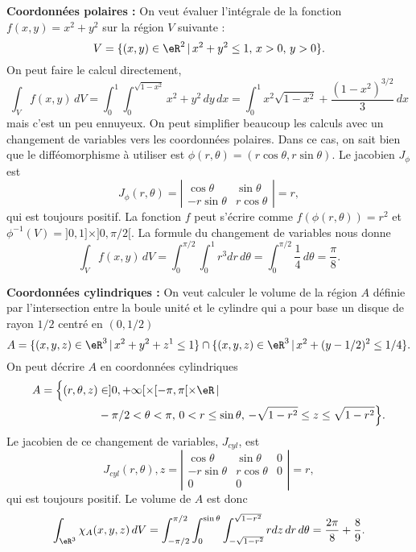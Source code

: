 \begin{example} 
\textbf{Coordonnées polaires : }On veut évaluer l'intégrale de la fonction $f(x,y)= x^2+y^2$ sur la région $V$ suivante :
\[
V=\{(x,y) \in \eR^2\,\vert\, x^2+y^2\leq 1,\, x>0,\, y>0\}.
\]
On peut faire le calcul directement,
\[
\int_{V}f(x,y)\, dV=\int_0^1\int_0^{\sqrt{1-x^2}}x^2+y^2\, dy\,dx=\int_0^1x^2\sqrt{1-x^2} + \frac{(1-x^2)^{3/2}}{3}\, dx  
\] 
mais c'est un peu ennuyeux. On peut simplifier beaucoup les calculs avec un changement de variables vers les coordonnées polaires. Dans ce cas, on sait bien que le difféomorphisme à utiliser est $\phi(r,\theta)=(r\cos \theta, r\sin\theta)$. Le jacobien  $J_{\phi}$ est
\begin{equation}
 J_{\phi}(r, \theta)= \left\vert\begin{array}{cc}
\cos \theta & \sin \theta \\
-r\sin \theta  & r\cos \theta
\end{array}\right\vert= r,
\end{equation}
qui est toujours positif. La fonction $f$ peut s'écrire comme $f(\phi(r,\theta))=r^2$ et $\phi^{-1}(V)=]0,1]\times]0, \pi/2[$.  
La formule du changement de variables nous donne
\[
\int_{V}f(x,y)\, dV=\int_0^{\pi/2}\int_0^{1}r^3 dr\,d\theta=\int_0^{\pi/2}\frac{1}{4}\,d\theta=\frac{\pi}{8}.  
\] 
\end{example}

\begin{example}
\textbf{Coordonnées cylindriques : }On veut calculer le volume de la région $A$ définie par  l'intersection entre la boule unité et le cylindre qui a pour base un disque de rayon $1/2$ centré en $(0, 1/2)$
\[
A=\{(x,y,z) \in\eR^3 \,\vert\, x^2+y^2+z^1\leq 1\}\cap\{(x,y,z) \in \eR^3\,\vert\, x^2+(y-1/2)^2\leq 1/4\}.
\]
On peut décrire $A$ en coordonnées cylindriques
\begin{equation}
  \begin{aligned}
    A=\Big\{(r,\theta,z) &\in ]0, +\infty[\times [-\pi,\pi[\times \eR\,\vert\,\\
& -\pi/2<\theta<\pi, \, 0<r\leq \sin\theta, \, -\sqrt{1-r^2}\leq z\leq\sqrt{1-r^2} \Big\}.
  \end{aligned}
\end{equation}
Le jacobien de ce changement de variables,  $J_{cyl}$, est
\begin{equation}
 J_{cyl}(r, \theta), z= \left\vert\begin{array}{ccc}
\cos \theta & \sin \theta & 0\\
-r\sin \theta  & r\cos \theta &0 \\
0&0&
\end{array}\right\vert= r,
\end{equation}
qui est toujours positif. Le volume de $A$ est donc
\[
\int_{\eR^3}\chi_{A}(x,y,z)\, dV=\int_{-\pi/2}^{\pi/2}\int_0^{\sin\theta}\int_{-\sqrt{1-r^2}}^{\sqrt{1-r^2}} r dz\,dr\,d\theta=\frac{2\pi}{8}+\frac{8}{9}.  
\] 
\end{example}

